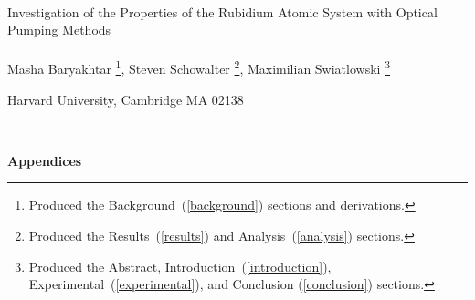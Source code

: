 \documentclass[12pt,notitlepage]{article}
\begin{document}


\begin{titlepage}
\begin{center}

\ \\
\vspace{.5in}

{\Huge Investigation of the Properties of the Rubidium Atomic System with Optical Pumping Methods \\}
\ \\



\large{Masha Baryakhtar \footnote{Produced the Background~(\ref{background}) sections and derivations.}, Steven Schowalter \footnote{Produced the Results~(\ref{results}) and Analysis~(\ref{analysis}) sections.}, Maximilian Swiatlowski \footnote{Produced the Abstract, Introduction~(\ref{introduction}), Experimental~(\ref{experimental}), and Conclusion (\ref{conclusion}) sections.}}

\small{Harvard University, Cambridge MA 02138}

\ \\




\end{center}
\end{titlepage}

\clearpage














\vspace{.5 in}

\appendix



\begin{center}
\begin{Large}
\bfseries{Appendices}
\end{Large}
\end{center}





\end{document}
